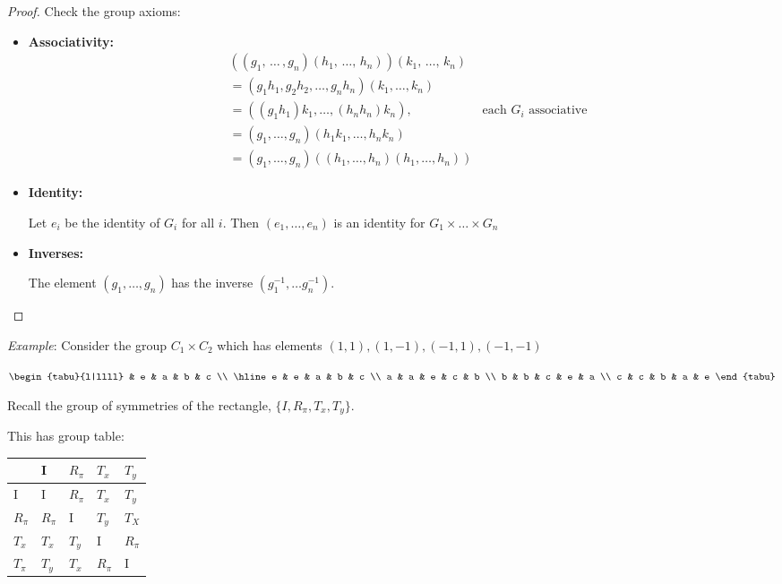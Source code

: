 \documentclass{article}
\theoremstyle{definition}
\begin{document}
\begin{proof}
Check the group axioms:
\begin{itemize}
  \item 
    \textbf{Associativity:}
  \begin{align*}
    & ((g_1, \, \ldots \, , g_n)(h_1,\, \ldots, \, h_n)) (k_1, \, \ldots , \, k_n) & \\
    &= (g_1 h_1, g_2 h_2, \ldots, g_n h_n) (k_1, \ldots , k_n) & \\
    &= ((g_1 h_1)k_1, \ldots , (h_n h_n)k_n), & 
      \text{each } G_i \text{ associative}\\
    &= (g_1, \ldots, g_n) (h_1 k_1, \ldots, h_n k_n) & \\
    &= (g_1, \ldots, g_n) ((h_1, \ldots, h_n) (h_1, \ldots, h_n)) &
  \end{align*}
\item
  \textbf{Identity:}

Let $e_i$ be the identity of $G_i$ for all $i$. Then $(e_1, \ldots, e_n)$ is an identity for $G_1 \times \ldots \times G_n$
\item
  \textbf{Inverses:}

The element $(g_1, \ldots , g_n)$ has the inverse $(g_1^{-1}, \ldots g_n^{-1})$.

\end{itemize}

\end{proof}
\emph{Example}: Consider the group $C_1 \times C_2$ which has elements $(1,1), (1,-1),(-1,1),(-1,-1)$

\begin{table}[h]
\centering
\label{my-label}
$\begin{tabu}{l|llll}
  & e & a & b & c \\ 
  \hline
e & e & a & b & c \\
a & a & e & c & b \\
b & b & c & e & a \\
c & c & b & a & e
\end{tabu}$
\end{table}

Recall the group of symmetries of the rectangle, $\{I, R_\pi, T_x, T_y\}$.

This has group table:

\begin{table}[h]
\centering
\label{my-label}
\begin{tabular}{l|llll}
       & I      & $R_\pi$ & $T_x$   & $T_y$   \\
       \hline
I      & I      & $R_\pi$ & $T_x$   & $T_y$   \\
$R_\pi$ & $R_\pi$ & I      & $T_y$   & $T_X$    \\
$T_x$   & $T_x$   & $T_y$   & I      & $R_\pi$ \\
$T_\pi$ & $T_y$   & $T_x$   & $R_\pi$ & I     
\end{tabular}
\end{table}
\end{document}
